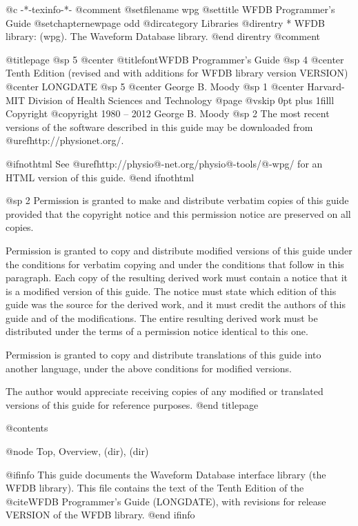 	@c -*-texinfo-*-
@comment %
@setfilename wpg
@settitle WFDB Programmer's Guide
@setchapternewpage odd
@dircategory Libraries
@direntry
* WFDB library: (wpg).		The Waveform Database library.
@end direntry
@comment %

@titlepage
@sp 5
@center @titlefont{WFDB Programmer's Guide}
@sp 4
@center Tenth Edition (revised and with additions for WFDB library version VERSION)
@center LONGDATE
@sp 5
@center George B. Moody
@sp 1
@center Harvard-MIT Division of Health Sciences and Technology
@page
@vskip 0pt plus 1filll
Copyright @copyright{} 1980 -- 2012 George B. Moody
@sp 2
The most recent versions of the software described in this guide may be
downloaded from @uref{http://physionet.org/}.

@ifnothtml
See @uref{http://physio@-net.org/physio@-tools/@-wpg/}
for an HTML version of this guide.
@end ifnothtml

@sp 2
Permission is granted to make and distribute verbatim copies of this
guide provided that the copyright notice and this permission notice are
preserved on all copies.

Permission is granted to copy and distribute modified versions of this
guide under the conditions for verbatim copying and under the conditions
that follow in this paragraph.  Each copy of the resulting derived work
must contain a notice that it is a modified version of this guide.  The
notice must state which edition of this guide was the source for the derived
work, and it must credit the authors of this guide and of the
modifications.  The entire resulting derived work must be distributed
under the terms of a permission notice identical to this one.

Permission is granted to copy and distribute translations of this guide
into another language, under the above conditions for modified versions.

The author would appreciate receiving copies of any modified or
translated versions of this guide for reference purposes.
@end titlepage

@contents

@node Top, Overview, (dir), (dir)

@ifinfo
This guide documents the Waveform Database interface library (the WFDB
library).  This file contains the text of the Tenth Edition of
the @cite{WFDB Programmer's Guide} (LONGDATE), with
revisions for release VERSION of the WFDB library.
@end ifinfo

